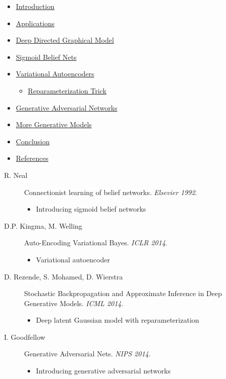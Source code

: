 \documentclass[11pt, a4paper, landscape]{article}
\begin{document}
\TitlePage


\NewPage{}
\vfill
\begin{itemize}
  \item \hyperlink{sli:introduction}{Introduction}
  \item \hyperlink{sli:applications}{Applications}
  \item \hyperlink{sli:graphicalmodel}{Deep Directed Graphical Model}
  \item \hyperlink{sli:sbn}{Sigmoid Belief Nets}
  \item \hyperlink{sli:vae}{Variational Autoencoders}
  \begin{itemize}
    \item \hyperlink{sli:reptrick}{Reparameterization Trick}
  \end{itemize}
  \item \hyperlink{sli:gan}{Generative Adversarial Networks}
  \item \hyperlink{sli:more}{More Generative Models}
  \item \hyperlink{sli:conclusion}{Conclusion}
  \item \hyperlink{sli:references}{References}
\end{itemize}
\vfill




\NewPage{}
\vfill
\begin{description}
	\item [R. Neal] Connectionist learning of belief networks. {\em Elsevier 1992}.
	\begin{itemize}
		\item Introducing sigmoid belief networks
	\end{itemize}
	\item [D.P. Kingma, M. Welling] Auto-Encoding Variational Bayes. {\em ICLR 2014}.
	\begin{itemize}
		\item Variational autoencoder
	\end{itemize}
	\item [D. Rezende, S. Mohamed, D. Wierstra] Stochastic Backpropagation and Approximate Inference in Deep Generative Models. {\em ICML 2014}.
	\begin{itemize}
		\item Deep latent Gaussian model with reparameterization
	\end{itemize}
	\item [I. Goodfellow] Generative Adversarial Nets. {\em NIPS 2014}.
	\begin{itemize}
		\item Introducing generative adversarial networks
	\end{itemize}
\end{description}
\vfill
\end{document}
